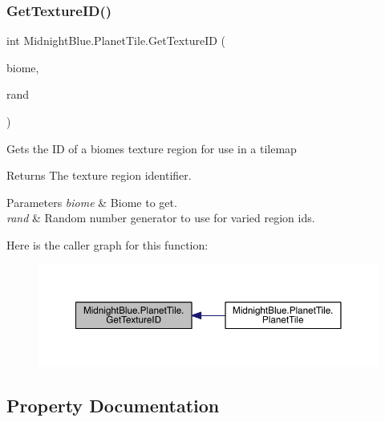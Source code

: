 \subsubsection{\texorpdfstring{Get\+Texture\+I\+D()}{GetTextureID()}}
{\footnotesize\ttfamily int Midnight\+Blue.\+Planet\+Tile.\+Get\+Texture\+ID (\begin{DoxyParamCaption}\item[{\hyperlink{namespace_midnight_blue_a8a6ba5637b64c3eb991f00d48decf381}{Biome}}]{biome,  }\item[{Random}]{rand }\end{DoxyParamCaption})\hspace{0.3cm}{\ttfamily [inline]}}



Gets the ID of a biomes texture region for use in a tilemap 

\begin{DoxyReturn}{Returns}
The texture region identifier.
\end{DoxyReturn}

\begin{DoxyParams}{Parameters}
{\em biome} & Biome to get.\\
\hline
{\em rand} & Random number generator to use for varied region id\textquotesingle{}s.\\
\hline
\end{DoxyParams}
Here is the caller graph for this function\+:\nopagebreak
\begin{figure}[H]
\begin{center}
\leavevmode
\includegraphics[width=350pt]{class_midnight_blue_1_1_planet_tile_a0ba5d9886790e8f8d9e54e1873d5565b_icgraph}
\end{center}
\end{figure}


\subsection{Property Documentation}
\hypertarget{class_midnight_blue_1_1_planet_tile_a56f9f50efa0b740b3ce229cb4170fd97}{}\label{class_midnight_blue_1_1_planet_tile_a56f9f50efa0b740b3ce229cb4170fd97} 
